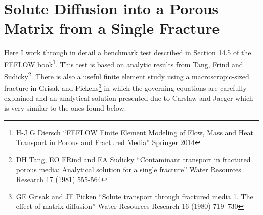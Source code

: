 \documentclass[]{scrreprt}
\begin{document}
\chapter{Solute Diffusion into a Porous Matrix from a Single Fracture}

Here I work through in detail a benchmark test described in Section
14.5 of the FEFLOW book\footnote{H-J G Diersch ``FEFLOW Finite Element
  Modeling of Flow, Mass and Heat Transport in Porous and Fractured
  Media'' Springer 2014}.  This test is based on analytic results from
Tang, Frind and Sudicky\footnote{DH Tang, EO FRind and EA Sudicky
  ``Contaminant transport in fractured porous media: Analytical
  solution for a single fracture'' Water Resources Research 17 (1981)
  555-564}.  There is also a useful finite element study using a
macroscropic-sized fracture in Grisak and Pickens\footnote{GE Grisak
  and JF Picken ``Solute transport through fractured media 1.  The
  effect of matrix diffusion'' Water Resources Research 16 (1980)
  719--730} in which the governing equations are carefully explained
and an analytical solution presented due to Carslaw and Jaeger which
is very similar to the ones found below.
\end{document}
